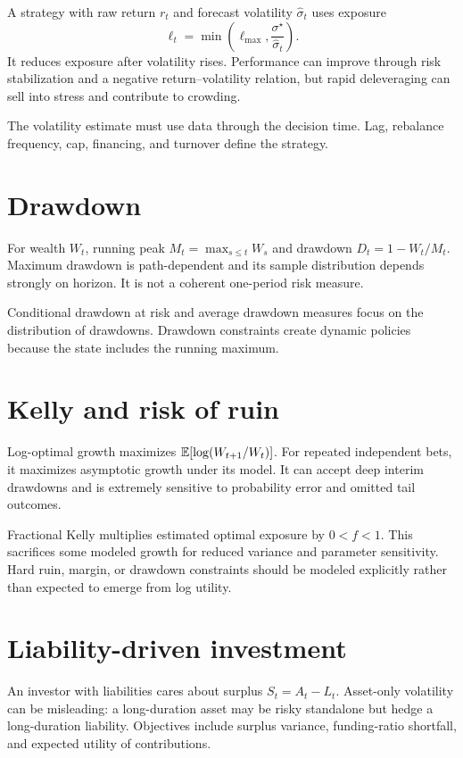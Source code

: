 A strategy with raw return $r_t$ and forecast volatility $\widehat\sigma_t$ uses
exposure
\[
\ell_t=\min\left(\ell_{\max},
\frac{\sigma^\star}{\widehat\sigma_t}\right).
\]
It reduces exposure after volatility rises. Performance can improve through risk
stabilization and a negative return--volatility relation, but rapid deleveraging can
sell into stress and contribute to crowding.

The volatility estimate must use data through the decision time. Lag, rebalance
frequency, cap, financing, and turnover define the strategy.

\section{Drawdown}

For wealth $W_t$, running peak $M_t=\max_{s\leq t}W_s$ and drawdown
$D_t=1-W_t/M_t$. Maximum drawdown is path-dependent and its sample distribution
depends strongly on horizon. It is not a coherent one-period risk measure.

Conditional drawdown at risk and average drawdown measures focus on the distribution
of drawdowns. Drawdown constraints create dynamic policies because the state includes
the running maximum.

\section{Kelly and risk of ruin}

Log-optimal growth maximizes $\operatorname{\mathbb E}[\log(W_{t+1}/W_t)]$. For repeated independent bets,
it maximizes asymptotic growth under its model. It can accept deep interim drawdowns
and is extremely sensitive to probability error and omitted tail outcomes.

Fractional Kelly multiplies estimated optimal exposure by $0<f<1$. This sacrifices
some modeled growth for reduced variance and parameter sensitivity. Hard ruin,
margin, or drawdown constraints should be modeled explicitly rather than expected to
emerge from log utility.

\section{Liability-driven investment}

An investor with liabilities cares about surplus
$S_t=A_t-L_t$. Asset-only volatility can be misleading: a long-duration asset may be
risky standalone but hedge a long-duration liability. Objectives include surplus
variance, funding-ratio shortfall, and expected utility of contributions.

